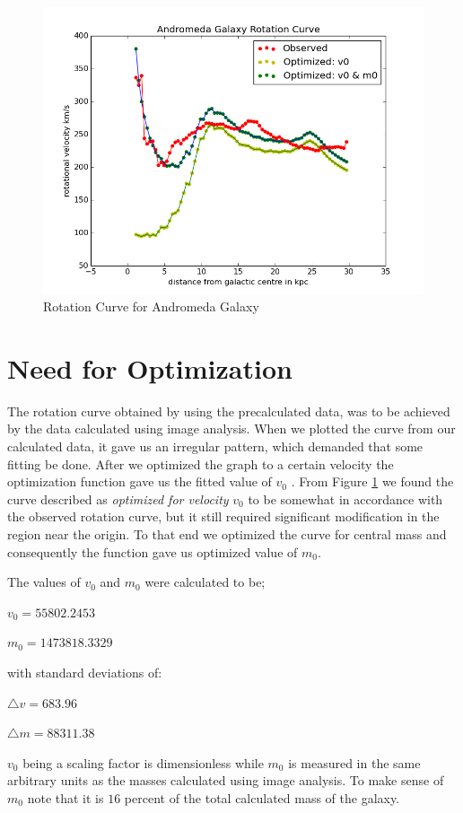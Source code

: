 \begin{figure} [h]
\centering
\includegraphics[scale=0.5]{best}
\caption{Rotation Curve for Andromeda Galaxy}
\label{curves}
\end{figure}

\section{Need for Optimization}

The rotation curve obtained by using the precalculated data, was to be achieved by the data calculated using image analysis. When we plotted the curve from our calculated data, it gave us an irregular pattern, which demanded that some fitting be done. After we optimized the graph to a certain velocity the optimization function gave us the fitted value of $v_0$ . From Figure \ref{curves} we found the curve described as \textit{optimized for velocity} \textbf{$v_{0}$} to be somewhat in accordance with the observed rotation curve, but it still required significant modification in the region near the origin.
To that end we optimized the curve for central mass and consequently the function gave us optimized value of \textbf{$m_{0}$}. 

The values of $v_{0}$ and $m_{0}$ were calculated to be;

$v_{0} = 55802.2453 $         

$m_{0} = 1473818.3329 $

with standard deviations of:

$\triangle v =  683.96$

$\triangle m = 88311.38 $

$v_0$ being a scaling factor is dimensionless while $m_0$ is measured in the same arbitrary units as the masses calculated using image analysis. To make sense of $m_0$ note that it is $16$ percent of the total calculated mass of the galaxy.